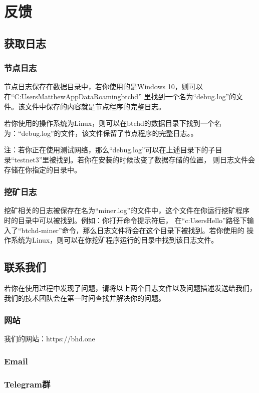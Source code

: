 \chapter{反馈}
\section{获取日志}
\subsection{节点日志}
\begin{flushleft}
    节点日志保存在数据目录中，若你使用的是Windows 10，则可以在``C:UsersMatthewAppDataRoamingbtchd''
    里找到一个名为``debug.log''的文件。该文件中保存的内容就是节点程序的完整日志。
\end{flushleft}
\begin{flushleft}
    若你使用的操作系统为Linux，则可以在btchd的数据目录下找到一个名为：``debug.log''的文件，该文件保留了节点程序的完整日志。。
\end{flushleft}
\small
\begin{flushleft}
    注：若你正在使用测试网络，那么``debug.log''可以在上述目录下的子目录``testnet3''里被找到。若你在安装的时候改变了数据存储的位置，
    则日志文件会存储在你指定的目录中。
\end{flushleft}
\normalsize
\subsection{挖矿日志}
\begin{flushleft}
    挖矿相关的日志被保存在名为``miner.log''的文件中，这个文件在你运行挖矿程序时的目录中可以被找到。例如：你打开命令提示符后，
    在``c:UsersHello''路径下输入了``btchd-miner''命令，那么日志文件将会在这个目录下被找到。若你使用的
    操作系统为Linux，则可以在你挖矿程序运行的目录中找到该日志文件。
\end{flushleft}
\section{联系我们}
\begin{flushleft}
    若你在使用过程中发现了问题，请将以上两个日志文件以及问题描述发送给我们，我们的技术团队会在第一时间查找并解决你的问题。
\end{flushleft}
\subsection{网站}
\begin{flushleft}
    我们的网站：https://bhd.one
\end{flushleft}
\subsection{Email}
\subsection{Telegram群}
